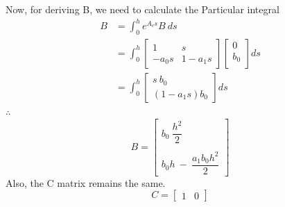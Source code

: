\documentclass[a4paper,12pt]{article}
\begin{document}
Now, for deriving B, we need to calculate the Particular integral 
\begin{align*}
	B &= \int_{0}^{h} e^{A_c s} B \ ds \\
	&= \int_{0}^{h} \begin{bmatrix}
			1 & s\\
			-a_0 s & 1 - a_1 s
	\end{bmatrix} 
	\begin{bmatrix}
		0\\
		b_0\\
	\end{bmatrix} ds \\
	&= \int_{0}^{h} \begin{bmatrix}
			s \ b_0\\
			(1 - a_1 s) b_0
	\end{bmatrix} ds
\end{align*}
$\therefore$
\begin{equation}
\boxed{
B = \begin{bmatrix}
b_0 \ \dfrac{h^2}{2} \\ \\
b_0 h \ - \ \dfrac{a_1 b_0 h^2}{2}
\end{bmatrix}}
\end{equation}
Also, the C matrix remains the same.
\begin{equation}
\boxed{
C = \begin{bmatrix}
1 & 0
\end{bmatrix}}
\end{equation}
\end{document}
